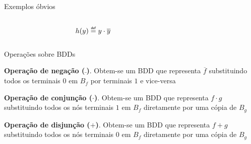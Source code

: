 \expandafter\documentclass\expandafter[table, usenames, svgnames, dvipsnames,14pt, \classopts]{beamer}
\newcommand\defeq{\mathrel{\overset{\makebox[0pt]{\mbox{\normalfont\tiny\sffamily def}}}{=}}}
\begin{document}
\begin{frame}{Exemplos óbvios}
\begin{columns}[c]
\begin{figure}
\begin{tikzpicture}
                \end{tikzpicture}

            \end{figure}

            \begin{figure}

                \caption{$h(y) \defeq y \cdot \overline{y}$}
            

            \end{figure}
        
    \end{columns}

\end{frame}

\begin{frame}{Operações sobre \uppercase{BDD}s}

    \begin{outline}
        \small
        \1 \textbf{Operação de negação ($\bar{~}$)}. Obtem-se um BDD que representa $\overline{f}$ substituindo todos os terminais $0$ em $B_f$ por terminais $1$ e vice-versa
        
        \vspace{1em}
        
        \1 \textbf{Operação de conjunção ($\cdot$)}. Obtem-se um BDD que representa $f \cdot g$ substituindo todos os nós terminais $1$ em $B_f$ diretamente por uma cópia de $B_g$
        
        \vspace{1em}
        
        \1 \textbf{Operação de disjunção ($+$)}. Obtem-se um BDD que representa $f + g$ substituindo todos os nós terminais $0$ em $B_f$ diretamente por uma cópia de $B_g$
    \end{outline}

\end{frame}
\end{document}
